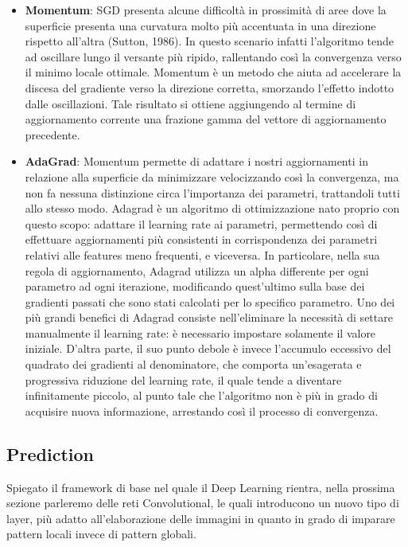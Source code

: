 \begin{itemize}
    \item \textbf{Momentum}: SGD presenta alcune difficoltà in prossimità di aree dove la superficie presenta una curvatura molto più accentuata in una direzione rispetto all'altra (Sutton, 1986). In questo scenario infatti l'algoritmo tende ad oscillare lungo il versante più ripido, rallentando così la convergenza verso il minimo locale ottimale. Momentum \cite{qian1999momentum} è un metodo che aiuta ad accelerare la discesa del gradiente verso la direzione corretta, smorzando l'effetto indotto dalle oscillazioni. Tale risultato si ottiene aggiungendo al termine di aggiornamento corrente una frazione gamma del vettore di aggiornamento precedente.
    
    \item \textbf{AdaGrad}: Momentum permette di adattare i nostri aggiornamenti in relazione alla superficie da minimizzare velocizzando così la convergenza, ma non fa nessuna distinzione circa l'importanza dei parametri, trattandoli tutti allo stesso modo. Adagrad \cite{duchi2011adaptive} è un algoritmo di ottimizzazione nato proprio con questo scopo: adattare il learning rate ai parametri, permettendo così di effettuare aggiornamenti più consistenti in corrispondenza dei parametri relativi alle features meno frequenti, e viceversa. In particolare, nella sua regola di aggiornamento, Adagrad utilizza un alpha differente per ogni parametro ad ogni iterazione, modificando quest'ultimo sulla base dei gradienti passati che sono stati calcolati per lo specifico parametro. Uno dei più grandi benefici di Adagrad consiste nell'eliminare la necessità di settare manualmente il learning rate: è necessario impostare solamente il valore iniziale. D'altra parte, il suo punto debole è invece l'accumulo eccessivo del quadrato dei gradienti al denominatore, che comporta un'esagerata e progressiva riduzione del learning rate, il quale tende a diventare infinitamente piccolo, al punto tale che l'algoritmo non è più in grado di acquisire nuova informazione, arrestando così il processo di convergenza.
\end{itemize}




\subsection{Prediction}
Spiegato il framework di base nel quale il Deep Learning rientra, nella prossima sezione parleremo delle reti Convolutional, le quali introducono un nuovo tipo di layer, più adatto all'elaborazione delle immagini in quanto in grado di imparare pattern locali invece di pattern globali.


